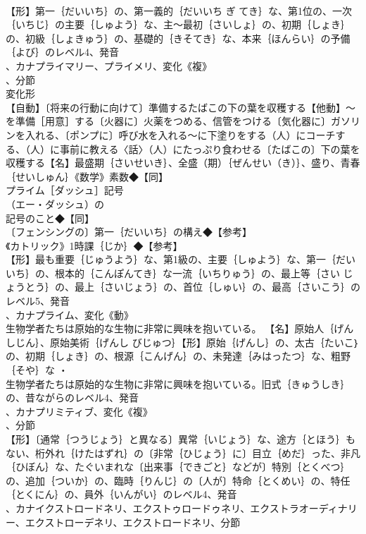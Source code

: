 \documentclass[8pt]{extreport}
\begin{document}
\begin{CJK}{UTF8}{min}
\\	【形】第一｛だいいち｝の、第一義的｛だいいち ぎ てき｝な、第1位の、一次｛いちじ｝の主要｛しゅよう｝な、主～最初｛さいしょ｝の、初期｛しょき｝の、初級｛しょきゅう｝の、基礎的｛きそてき｝な、本来｛ほんらい｝の予備｛よび｝のレベル4、発音
\\	、カナプライマリー、プライメリ、変化《複》
\\	、分節
\\	変化形 
\\	【自動】〔将来の行動に向けて〕準備するたばこの下の葉を収穫する【他動】～を準備［用意］する〔火器に〕火薬をつめる、信管をつける〔気化器に〕ガソリンを入れる、〔ポンプに〕呼び水を入れる～に下塗りをする（人）にコーチする、（人）に事前に教える〈話〉（人）にたっぷり食わせる〔たばこの〕下の葉を収穫する【名】最盛期｛さいせいき｝、全盛（期）｛ぜんせい（き）｝、盛り、青春｛せいしゅん｝《数学》素数◆【同】
\\	プライム［ダッシュ］記号
\\	（エー・ダッシュ）の
\\	記号のこと◆【同】
\\	〔フェンシングの〕第一｛だいいち｝の構え◆【参考】
\\	《カトリック》1時課｛じか｝◆【参考】
\\	【形】最も重要｛じゅうよう｝な、第1級の、主要｛しゅよう｝な、第一｛だいいち｝の、根本的｛こんぽんてき｝な一流｛いちりゅう｝の、最上等｛さい じょうとう｝の、最上｛さいじょう｝の、首位｛しゅい｝の、最高｛さいこう｝のレベル5、発音
\\	、カナプライム、変化《動》
\\	生物学者たちは原始的な生物に非常に興味を抱いている。		【名】原始人｛げんしじん｝、原始美術｛げんし びじゅつ｝【形】原始｛げんし｝の、太古｛たいこ｝の、初期｛しょき｝の、根源｛こんげん｝の、未発達｛みはったつ｝な、粗野｛そや｝な ・
\\	生物学者たちは原始的な生物に非常に興味を抱いている。旧式｛きゅうしき｝の、昔ながらのレベル4、発音
\\	、カナプリミティブ、変化《複》
\\	、分節
\\	【形】〔通常｛つうじょう｝と異なる〕異常｛いじょう｝な、途方｛とほう｝もない、桁外れ｛けたはずれ｝の〔非常｛ひじょう｝に〕目立｛めだ｝った、非凡｛ひぼん｝な、たぐいまれな〔出来事｛できごと｝などが〕特別｛とくべつ｝の、追加｛ついか｝の、臨時｛りんじ｝の〔人が〕特命｛とくめい｝の、特任｛とくにん｝の、員外｛いんがい｝のレベル4、発音
\\	、カナイクストロードネリ、エクストゥロードゥネリ、エクストラオーディナリー、エクストローデネリ、エクストロードネリ、分節

\end{CJK}
\end{document}
